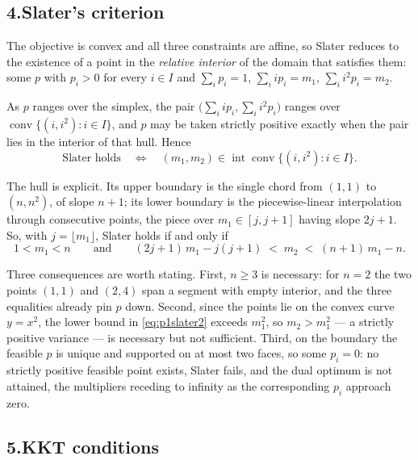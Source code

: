 \documentclass[11pt]{article}
\DeclareMathOperator{\conv}{conv}
\DeclareMathOperator{\interior}{int}
\theoremstyle{definition}
\begin{document}
\subsection*{4.\quad Slater's criterion}

The objective is convex and all three constraints are affine, so Slater
reduces to the existence of a point in the \emph{relative interior} of
the domain that satisfies them: some $p$ with $p_i > 0$ for every
$i \in I$ and
$\sum_i p_i = 1$, $\sum_i i p_i = m_1$, $\sum_i i^2 p_i = m_2$.

As $p$ ranges over the simplex, the pair
$\bigl(\sum_i i p_i, \sum_i i^2 p_i\bigr)$ ranges over
$\conv\{(i,i^2) : i \in I\}$, and $p$ may be taken strictly positive
exactly when the pair lies in the interior of that hull. Hence
\begin{equation}\label{eq:p1slater}
  \text{Slater holds}
  \quad\Longleftrightarrow\quad
  (m_1,m_2) \in \interior \conv\bigl\{(i,i^2) : i \in I\bigr\}.
\end{equation}

The hull is explicit. Its upper boundary is the single chord from
$(1,1)$ to $(n,n^2)$, of slope $n+1$; its lower boundary is the
piecewise-linear interpolation through consecutive points, the piece
over $m_1 \in [j,j+1]$ having slope $2j+1$. So, with
$j = \lfloor m_1 \rfloor$, Slater holds if and only if
\begin{equation}\label{eq:p1slater2}
  1 < m_1 < n
  \qquad\text{and}\qquad
  (2j+1)\,m_1 - j(j+1) \;<\; m_2 \;<\; (n+1)\,m_1 - n .
\end{equation}

Three consequences are worth stating. First, $n \ge 3$ is necessary:
for $n = 2$ the two points $(1,1)$ and $(2,4)$ span a segment with
empty interior, and the three equalities already pin $p$ down. Second,
since the points lie on the convex curve $y = x^2$, the lower bound in
\eqref{eq:p1slater2} exceeds $m_1^2$, so $m_2 > m_1^2$ --- a strictly
positive variance --- is necessary but not sufficient. Third, on the
boundary the feasible $p$ is unique and supported on at most two faces,
so some $p_i = 0$: no strictly positive feasible point exists, Slater
fails, and the dual optimum is not attained, the multipliers receding
to infinity as the corresponding $p_i$ approach zero.

\subsection*{5.\quad KKT conditions}
\end{document}
